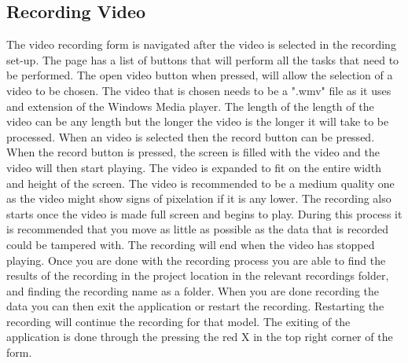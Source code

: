\subsection{Recording Video}
The video recording form is navigated after the video is selected in the recording set-up. The page has a list of buttons that will perform all the tasks that need to be performed. The open video button when pressed, will allow the selection of a video to be chosen. The video that is chosen needs to be a ".wmv" file as it uses and extension of the Windows Media player. The length of the length of the video can be any length but the longer the video is the longer it will take to be processed. When an video is selected then the record button can be pressed. When the record button is pressed, the screen is filled with the video and the video will then start playing. The video is expanded to fit on the entire width and height of the screen. The video is recommended to be a medium quality one as the video might show signs of pixelation if it is any lower. The recording also starts once the video is made full screen and begins to play. During this process it is recommended that you move as little as possible as the data that is recorded could be tampered with. The recording will end when the video has stopped playing. Once you are done with the recording process you are able to find the results of the recording in the project location in the relevant recordings folder, and finding the recording name as a folder. When you are done recording the data you can then exit the application or restart the recording. Restarting the recording will continue the recording for that model. The exiting of the application is done through the pressing the red X in the top right corner of the form.


